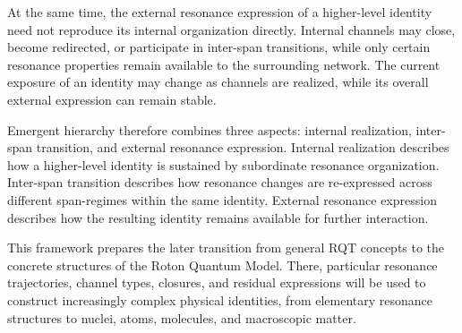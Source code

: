 \documentclass[11pt,a4paper]{article}
\begin{document}
At the same time, the external resonance expression of a higher-level identity need not reproduce its internal organization directly. Internal channels may close, become redirected, or participate in inter-span transitions, while only certain resonance properties remain available to the surrounding network. The current exposure of an identity may change as channels are realized, while its overall external expression can remain stable.

Emergent hierarchy therefore combines three aspects: internal realization, inter-span transition, and external resonance expression. Internal realization describes how a higher-level identity is sustained by subordinate resonance organization. Inter-span transition describes how resonance changes are re-expressed across different span-regimes within the same identity. External resonance expression describes how the resulting identity remains available for further interaction.

This framework prepares the later transition from general RQT concepts to the concrete structures of the Roton Quantum Model. There, particular resonance trajectories, channel types, closures, and residual expressions will be used to construct increasingly complex physical identities, from elementary resonance structures to nuclei, atoms, molecules, and macroscopic matter.



\end{document}
